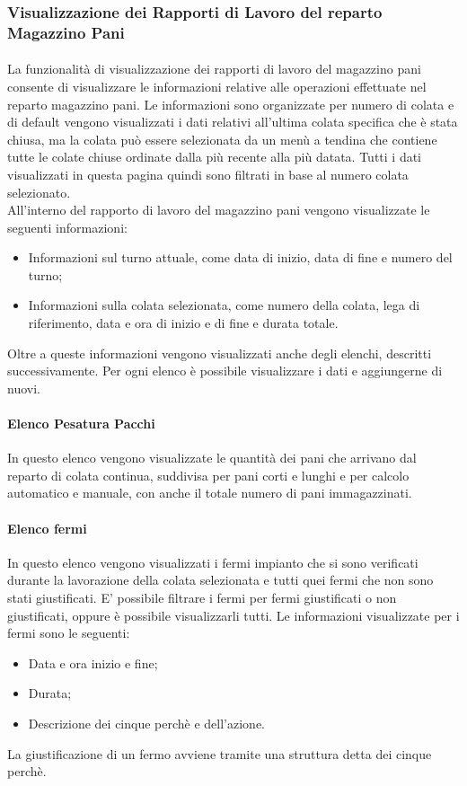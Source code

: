   \subsubsection{Visualizzazione dei Rapporti di Lavoro del reparto Magazzino Pani}
  \paragraph{}
  La funzionalità di visualizzazione dei rapporti di lavoro del magazzino pani consente di visualizzare 
  le informazioni relative alle operazioni effettuate nel reparto magazzino pani. Le informazioni sono 
  organizzate per numero di colata e di default vengono visualizzati i dati relativi all'ultima colata specifica che è 
  stata chiusa, ma la colata può essere selezionata da un menù a tendina che contiene tutte le colate chiuse ordinate 
  dalla più recente alla più datata. Tutti i dati visualizzati in questa pagina quindi sono filtrati in base al numero colata selezionato.\\
  All’interno del rapporto di lavoro del magazzino pani vengono visualizzate le seguenti informazioni:
  \begin{itemize}
    \item Informazioni sul turno attuale, come data di inizio, data di fine e numero del turno;
    \item Informazioni sulla colata selezionata, come numero della colata, lega di riferimento, data e ora 
    di inizio e di fine e durata totale.
  \end{itemize}
  Oltre a queste informazioni vengono visualizzati anche degli elenchi, descritti successivamente. 
  Per ogni elenco è possibile visualizzare i dati e aggiungerne di nuovi.
    
  \paragraph{Elenco Pesatura Pacchi}
  In questo elenco vengono visualizzate le quantità dei pani che arrivano dal reparto di colata continua, 
  suddivisa per pani corti e lunghi e per calcolo automatico e manuale, con anche il totale numero di pani 
  immagazzinati.

  \paragraph{Elenco fermi}
  In questo elenco vengono visualizzati i fermi impianto che si sono verificati durante la lavorazione della colata selezionata e 
  tutti quei fermi che non sono stati giustificati. E' possibile filtrare i fermi per fermi giustificati 
  o non giustificati, oppure è possibile visualizzarli tutti. Le informazioni visualizzate per i fermi 
  sono le seguenti:
  \begin{itemize}
    \item Data e ora inizio e fine;
    \item Durata;
    \item Descrizione dei cinque perchè e dell’azione.
  \end{itemize}
  La giustificazione di un fermo avviene tramite una struttura detta dei cinque perchè.


